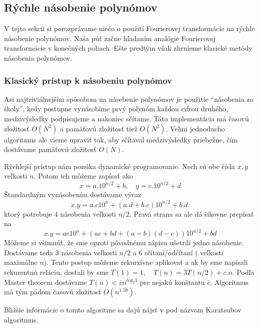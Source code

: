 \subsection{Rýchle násobenie polynómov}

V tejto sekcii si porozprávame niečo o použití Fourierovej
transformácie na rýchle násobenie polynómov. Naša púť začne hľadaním
analógie Fourierovej transformácie v konečných poliach. Ešte predtým
však zhrnieme klasické metódy násobenia polynómov.

\subsubsection{Klasický prístup k násobeniu polynómov}
Asi najtriviálnejším spôsobom na násebenie polynómov je použitie
``násobenia zo školy'', kedy postupne vynásobíme prvý polynóm
každou cifrou druhého, medzivýsledky podpisujeme a nakoniec sčítame.
Táto implementácia má časovú zložitosť $O(N^2)$ a pamäťovú zložitosť
tiež $O(N^2)$. Veľmi jednoducho algoritmus ale vieme upraviť tak,
aby sčítaval medzivýsledky priebežne, čím dostávame pamäťovú zložitosť
$O(N)$.

Rýchlejší prístup nám ponúka dynamické programovanie. Nech sú obe
čísla $x,y$ veľkosti $n$. Potom ich môžeme zapísať ako
\begin{equation*}
x= a. 10^{n/2} + b, \quad y=c. 10^{n/2} + d
\end{equation*}
Štandardným vynásobením dostávame výraz
\begin{equation*}
x.y = a.c 10^n + (a.d+b.c) 10^{n/2} + b.d.
\end{equation*}
ktorý potrebuje 4 násobenia veľkosti $n/2$.
Pravá strana sa ale dá šikovne prepísať na 
\begin{equation*}
x.y = ac 10^n + (ac + bd + (a-b)(d-c)) 10^{n/2} + bd
\end{equation*}
Môžeme si všimnúť, že sme oproti pôvodnému zápisu ušetrili jedno násobenie.
Dostávame teda 3 násobenia veľkosti $n/2$ a 6 sčítaní/odčítaní (
veľkosti maximálne $n$).
Tento postup môžeme rekurzívne aplikovať a ak by sme napísali
rekurentnú reláciu, dostali by sme $T(1)=1, \quad T(n)=3 T(n/2) +
c.n$. Podľa Master theorem \cite[p. 73-90]{Introduction} dostávame
$T(n) < \overline{c} n^{log_2 3}$ pre nejakú konštantu $\overline{c}$. 
Algoritmus má tým pádom časovú zložitosť $O(n^{1.59})$.

\begin{poznamka}
Bližšie informácie o tomto algoritme sa dajú nájsť v
 \cite[p. 118-119]{CompAlg} pod názvom Karatsubov algoritmus.
\end{poznamka}

